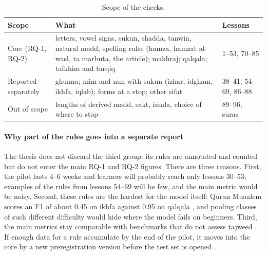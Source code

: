 \begin{table}[ht]
\centering\small
\caption{Scope of the checks.}
\label{tab:scope}
\begin{tabularx}{\linewidth}{@{}P{3.3cm}LP{2.6cm}@{}}
\toprule
Scope & What & Lessons \\
\midrule
Core (RQ-1, RQ-2) & letters, vowel signs, sukun, shadda, tanwin, natural madd, spelling rules (hamza,
  hamzat al-wasl, ta marbuta, the article); makhraj; qalqala; tafkhim and tarqiq & 1--53, 70--85 \\
Reported separately & ghunna; mim and nun with sukun (izhar, idgham, ikhfa, iqlab); forms at a stop; other sifat & 38--41, 54--69, 86--88 \\
Out of scope & lengths of derived madd, sakt, imala, choice of where to stop & 89--96, suras \\
\bottomrule
\end{tabularx}
\end{table}

\paragraph{Why part of the rules goes into a separate report} The thesis does not discard the third group: its
rules are annotated and counted but do not enter the main RQ-1 and RQ-2 figures. There are three reasons. First,
the pilot lasts 4--6 weeks and learners will probably reach only lessons 30--53; examples of the rules from
lessons 54--69 will be few, and the main metric would be noisy. Second, these rules are the hardest for the model
itself: Quran Muaalem scores an F1 of about 0.45 on ikhfa against 0.95 on qalqala \cite{SRC-002}, and pooling
classes of such different difficulty would hide where the model fails on beginners. Third, the main metrics stay
comparable with benchmarks that do not assess tajweed \cite{SRC-004,SRC-031}. If enough data for a rule
accumulate by the end of the pilot, it moves into the core by a new preregistration version before the test set
is opened .

